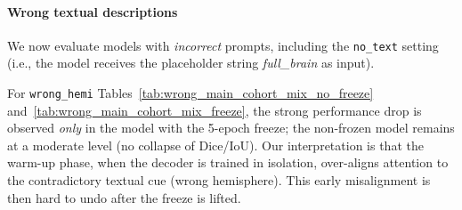 \documentclass[a4paper,12pt]{article}
\begin{document}


\paragraph{Wrong textual descriptions}
We now evaluate models with \emph{incorrect} prompts, including the \texttt{no\_text} setting (i.e., the model receives the placeholder string \textit{full\_brain} as input).

For \texttt{wrong\_hemi} Tables~\ref{tab:wrong_main_cohort_mix_no_freeze} and~\ref{tab:wrong_main_cohort_mix_freeze}, the strong performance drop is observed \emph{only} in the model with the 5-epoch freeze; the non-frozen model remains at a moderate level (no collapse of Dice/IoU). 
Our interpretation is that the warm-up phase, when the decoder is trained in isolation, over-aligns attention to the contradictory textual cue (wrong hemisphere). This early misalignment is then hard to undo after the freeze is lifted.
\end{document}
